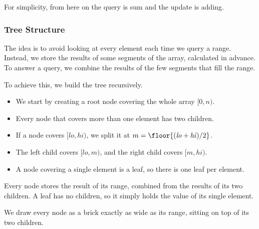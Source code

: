 {\small\leavevmode\color{muted} For simplicity, from here on the query is sum and the update is adding.\par}

\subsubsection{Tree Structure}
The idea is to avoid looking at every element each time we query a range. Instead, we store the results of some segments of the array, calculated in advance. To answer a query, we combine the results of the few segments that fill the range.

To achieve this, we build the tree recursively.
\begin{itemize}
\item We start by creating a root node covering the whole array \([0, n)\).
\item Every node that covers more than one element has two children.
\item If a node covers \([\mathit{lo}, \mathit{hi})\), we split it at \(m = \floor{(\mathit{lo} + \mathit{hi}) / 2}\).
\item The left child covers \([\mathit{lo}, m)\), and the right child covers \([m, \mathit{hi})\).
\item A node covering a single element is a leaf, so there is one leaf per element.
\end{itemize}
Every node stores the result of its range, combined from the results of its two children. A leaf has no children, so it simply holds the value of its single element.

We draw every node as a brick exactly as wide as its range, sitting on top of its two children.


